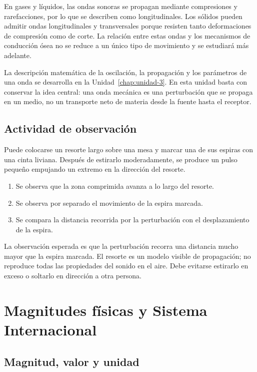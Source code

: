 En gases y líquidos, las ondas sonoras se propagan mediante compresiones y rarefacciones, por lo que se describen como longitudinales. Los sólidos pueden admitir ondas longitudinales y transversales porque resisten tanto deformaciones de compresión como de corte. La relación entre estas ondas y los mecanismos de conducción ósea no se reduce a un único tipo de movimiento y se estudiará más adelante.

La descripción matemática de la oscilación, la propagación y los parámetros de una onda se desarrolla en la Unidad~\ref{chap:unidad-3}. En esta unidad basta con conservar la idea central: una onda mecánica es una perturbación que se propaga en un medio, no un transporte neto de materia desde la fuente hasta el receptor.

\subsection{Actividad de observación}
\label{sec:u1-actividad-onda}

Puede colocarse un resorte largo sobre una mesa y marcar una de sus espiras con una cinta liviana. Después de estirarlo moderadamente, se produce un pulso pequeño empujando un extremo en la dirección del resorte.

\begin{enumerate}
    \item Se observa que la zona comprimida avanza a lo largo del resorte.
    \item Se observa por separado el movimiento de la espira marcada.
    \item Se compara la distancia recorrida por la perturbación con el desplazamiento de la espira.
\end{enumerate}

La observación esperada es que la perturbación recorra una distancia mucho mayor que la espira marcada. El resorte es un modelo visible de propagación; no reproduce todas las propiedades del sonido en el aire. Debe evitarse estirarlo en exceso o soltarlo en dirección a otra persona.

\section{Magnitudes físicas y Sistema Internacional}
\label{sec:u1-si}

\subsection{Magnitud, valor y unidad}
\label{sec:u1-magnitud-unidad}

